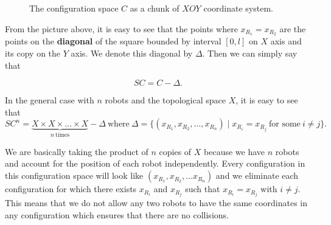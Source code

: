 \documentclass[12pt]{article}
\theoremstyle{definition}
\begin{document}
\begin{figure}[H]
    \centering
    \caption*{The configuration space $C$ as a chunk of $XOY$ coordinate system.}
\end{figure}

From the picture above, it is easy to see that the points where $x_{R_1} = x_{R_2}$
are the points on the \textbf{diagonal} of the square bounded by interval $[0, l]$ on $X$ axis
and its copy on the $Y$ axis. We denote this diagonal by $\Delta$. Then we can simply
say that

$$SC = C - \Delta.$$

In the general case with $n$ robots and the topological space $X$, it is easy to see that
$$SC^n = \underbrace{X \times X \times \dots \times X}_{n \ \text{times}} - \Delta \ \text{where} \ \Delta = \{(x_{R_1}, x_{R_2}, \dots, x_{R_n}) \mid x_{R_i} = x_{R_j} \ \text{for some} \ i \neq j\}.$$

We are basically taking the product of $n$ copies of $X$ because we have $n$ robots
and account for the position of each robot independently. Every configuration in this
configuration space will look like $(x_{R_1}, x_{R_2}, \dots x_{R_n})$ and we eliminate each
configuration for which there exists $x_{R_i}$ and $x_{R_j}$ such that $x_{R_i} = x_{R_j}$ with $i \neq j$.
This means that we do not allow any two robots to have the same coordinates in any configuration which
ensures that there are no collisions.
\end{document}
